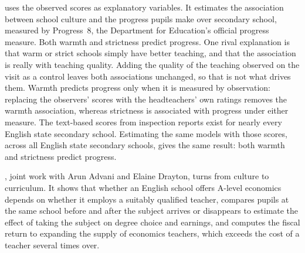  uses the observed scores as explanatory variables. It
estimates the association between school culture and the progress pupils
make over secondary school, measured by Progress~8, the Department for
Education's official progress measure. Both warmth and strictness predict
progress. One rival explanation is that warm or strict schools simply have
better teaching, and that the association is really with teaching quality.
Adding the quality of the teaching observed on the visit as a control
leaves both associations unchanged, so that is not what drives them. Warmth predicts progress only when
it is measured by observation: replacing the observers' scores with the
headteachers' own ratings removes the warmth association, whereas
strictness is associated with progress under either measure. The text-based
scores from inspection reports exist for nearly every English state
secondary school. Estimating the same models with those scores, across all
English state secondary schools, gives the same result: both warmth and
strictness predict progress.

, joint work with Arun Advani and Elaine Drayton, turns
from culture to curriculum. It shows that whether an English school offers
A-level economics depends on whether it employs a suitably qualified
teacher, compares pupils at the same school before and after the subject
arrives or disappears to estimate the effect of taking the subject on
degree choice and earnings, and computes the fiscal
return to expanding the supply of economics teachers, which exceeds the
cost of a teacher several times over.
